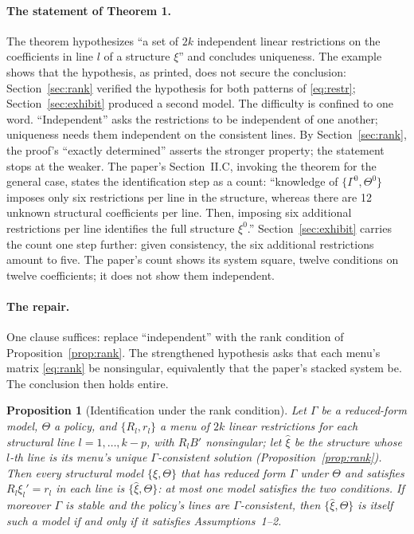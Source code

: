 \documentclass[11pt]{article}
\newtheorem{proposition}{Proposition}
\theoremstyle{remark}
\begin{document}
\paragraph{The statement of Theorem 1.}
The theorem hypothesizes ``a set of $2k$ independent linear restrictions on the coefficients in line $l$ of a structure $\xi$'' and concludes uniqueness. The example shows that the hypothesis, as printed, does not secure the conclusion: Section~\ref{sec:rank} verified the hypothesis for both patterns of \eqref{eq:restr}; Section~\ref{sec:exhibit} produced a second model. The difficulty is confined to one word. ``Independent'' asks the restrictions to be independent of one another; uniqueness needs them independent on the consistent lines. By Section~\ref{sec:rank}, the proof's ``exactly determined'' asserts the stronger property; the statement stops at the weaker. The paper's Section~II.C, invoking the theorem for the general case, states the identification step as a count: ``knowledge of $\{\Gamma^0,\Theta^0\}$ imposes only six restrictions per line in the structure, whereas there are 12 unknown structural coefficients per line. Then, imposing six additional restrictions per line identifies the full structure $\xi^0$.'' Section~\ref{sec:exhibit} carries the count one step further: given consistency, the six additional restrictions amount to five. The paper's count shows its system square, twelve conditions on twelve coefficients; it does not show them independent.

\paragraph{The repair.}
One clause suffices: replace ``independent'' with the rank condition of Proposition~\ref{prop:rank}. The strengthened hypothesis asks that each menu's matrix \eqref{eq:rank} be nonsingular, equivalently that the paper's stacked system be. The conclusion then holds entire.

\begin{proposition}[Identification under the rank
condition]\label{prop:repair} Let $\Gamma$ be a reduced-form model, $\Theta$ a policy, and $\{R_l,r_l\}$ a menu of $2k$ linear restrictions for each structural line $l=1,\dots,k-p$, with $R_lB'$ nonsingular; let $\hat\xi$ be the structure whose $l$-th line is its menu's unique $\Gamma$-consistent solution (Proposition~\ref{prop:rank}). Then every structural model $\{\xi,\Theta\}$ that has reduced form $\Gamma$ under $\Theta$ and satisfies $R_l\xi_l'=r_l$ in each line is $\{\hat\xi,\Theta\}$: at most one model satisfies the two conditions. If moreover $\Gamma$ is stable and the policy's lines are $\Gamma$-consistent, then $\{\hat\xi,\Theta\}$ is itself such a model if and only if it satisfies Assumptions~1--2.
\end{proposition}
\end{document}
